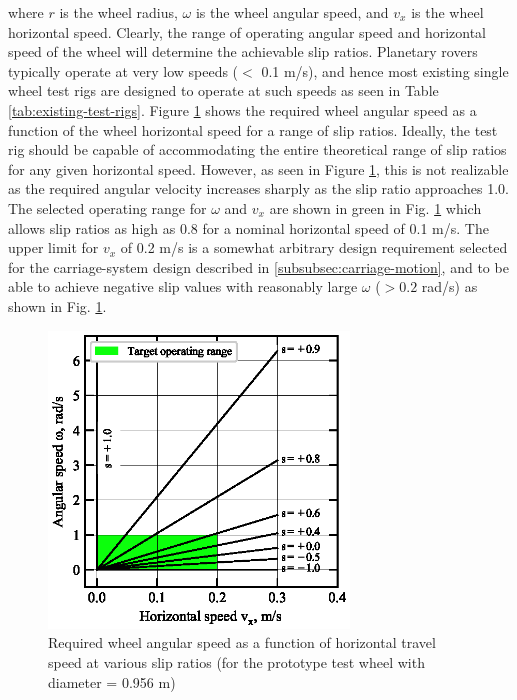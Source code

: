 \documentclass{article}
\begin{document}
where $r$ is the wheel radius, $\omega$ is the wheel angular speed, and $v_x$ is the wheel horizontal speed. Clearly, the range of operating angular speed and horizontal speed of the wheel will determine the achievable slip ratios. Planetary rovers typically operate at very low speeds ($<$ 0.1 m/s), and hence most existing single wheel test rigs are designed to operate at such speeds as seen in Table \ref{tab:existing-test-rigs}. Figure \ref{fig:slip-ratio-chart} shows the required wheel angular speed as a function of the wheel horizontal speed for a range of slip ratios. Ideally, the test rig should be capable of accommodating the entire theoretical range of slip ratios for any given horizontal speed. However, as seen in Figure \ref{fig:slip-ratio-chart}, this is not realizable as the required angular velocity increases sharply as the slip ratio approaches 1.0. The selected operating range for $\omega$ and $v_x$ are shown in green in Fig. \ref{fig:slip-ratio-chart} which allows slip ratios as high as 0.8 for a nominal horizontal speed of 0.1 m/s. The upper limit for $v_x$ of 0.2 m/s is a somewhat arbitrary design requirement selected for the carriage-system design described in \ref{subsubsec:carriage-motion}, and to be able to achieve negative slip values with reasonably large $\omega$ ($> 0.2$ rad/s) as shown in Fig. \ref{fig:slip-ratio-chart}. 


\begin{figure}[hbt!]
\centering
\includegraphics[width=3.15in]{plots/slip-ratios.eps}
\caption{Required wheel angular speed as a function of horizontal travel speed at various slip ratios (for the prototype test wheel with diameter = 0.956 m)}
\label{fig:slip-ratio-chart}
\end{figure}
\end{document}

